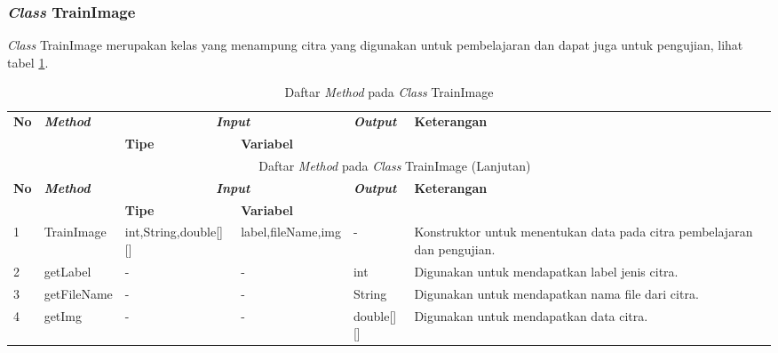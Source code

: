 \subsubsection{\textit{Class} TrainImage}
\noindent \textit{Class} TrainImage merupakan kelas yang menampung citra yang digunakan untuk pembelajaran dan dapat juga untuk pengujian, lihat tabel \ref{tbl:classTrainImage}.
\begingroup
\setlength{\LTleft}{-20cm plus -1fill}
\setlength{\LTright}{\LTleft}
\begin{small}
\begin{longtable}{|p{0.4cm}|p{2cm}|p{1.8cm}|p{1.8cm}|p{1.7cm}|p{3.55cm}|}
	\caption{Daftar \textit{Method} pada \textit{Class} TrainImage \label{tbl:classTrainImage}}\\
	\hline
	\multirow{2}{*}{\textbf{No}} & \multirow{2}{*}{\textit{\textbf{Method}}} & \multicolumn{2}{c|}{\textit{\textbf{Input}}} & \multirow{2}{*}{\textit{\textbf{Output}}} & 
	\multirow{2}{*}{\textbf{Keterangan}}\\
	\cline{3-4}
	& & \textbf{Tipe} & \textbf{Variabel} & & \\
	\endfirsthead
	\multicolumn{6}{c}{\textbf{\tablename~\thetable} Daftar \textit{Method} pada \textit{Class} TrainImage (Lanjutan)} \\
	\hline
	\multirow{2}{*}{\textbf{No}} & \multirow{2}{*}{\textit{\textbf{Method}}} & \multicolumn{2}{c|}{\textit{\textbf{Input}}} & \multirow{2}{*}{\textit{\textbf{Output}}} & 
	\multirow{2}{*}{\textbf{Keterangan}}\\
	\cline{3-4}
	& & \textbf{Tipe} & \textbf{Variabel} & & \\
	\endhead
	\hline
	1 & TrainImage & int,\newline String,\newline double[][] & label,\newline fileName,\newline img & - & Konstruktor untuk menentukan data pada citra pembelajaran dan pengujian.\\
	\hline
	2 & getLabel & - & - & int & Digunakan untuk mendapatkan label jenis citra.\\
	\hline
	3 & getFileName & - & - & String & Digunakan untuk mendapatkan nama file dari citra.\\
	\hline
	4 & getImg & - & - & double[][] & Digunakan untuk mendapatkan data citra.\\
	\hline
\end{longtable}
\end{small}
\endgroup

